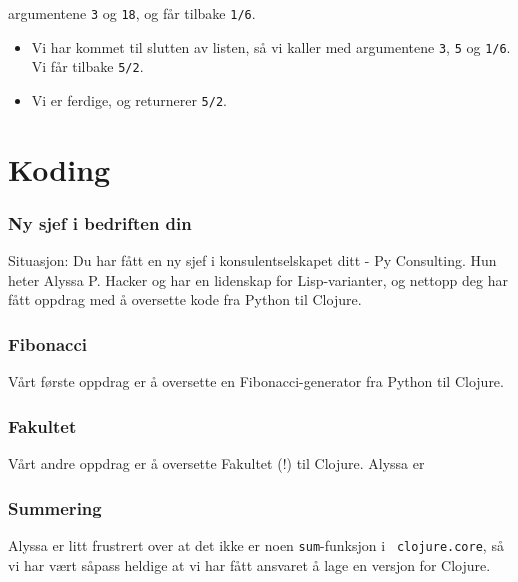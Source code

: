 \documentclass{beamer}
\begin{document}
\begin{frame}[fragile, t]
\begin{overprint}
\begin{itemize}
      argumentene {\tt 3} og {\tt 18}, og får tilbake {\tt 1/6}.
    \end{itemize}
    \begin{semiverbatim}
    \end{semiverbatim}
    \begin{itemize}
    \item<16-> Vi har kommet til slutten av listen, så vi kaller {\tt *} med
      argumentene {\tt 3}, {\tt 5} og {\tt 1/6}. Vi får tilbake {\tt 5/2}.
    \item<17-> Vi er ferdige, og returnerer {\tt 5/2}.
    \end{itemize}
  \end{overprint}

\end{frame}

\section{Koding}

\begin{frame}
  \frametitle{Ny sjef i bedriften din}

  Situasjon: Du har fått en ny sjef i konsulentselskapet ditt - Py
  Consulting. Hun heter Alyssa P. Hacker og har en lidenskap for Lisp-varianter,
  og nettopp deg har fått oppdrag med å oversette kode fra Python til Clojure.
\end{frame}

\begin{frame}
  \frametitle{Fibonacci}

  Vårt første oppdrag er å oversette en Fibonacci-generator fra Python til
  Clojure.
\end{frame}

\begin{frame}
  \frametitle{Fakultet}

  Vårt andre oppdrag er å oversette Fakultet (!) til Clojure. Alyssa er
\end{frame}

\begin{frame}
  \frametitle{Summering}

  Alyssa er litt frustrert over at det ikke er noen {\tt sum}-funksjon i {\tt
    clojure.core}, så vi har vært såpass heldige at vi har fått ansvaret å lage
  en versjon for Clojure.
\end{frame}
\end{document}
